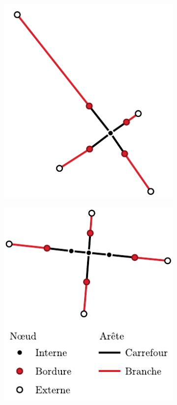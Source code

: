 \begin{figure}[ht]
    \centering
    \begin{subfigure}[t]{.25\linewidth}
        \centering
        \includegraphics[width=\linewidth]{images/evaluation/crseg/carrefour_simple.pdf}
        \caption{}
    \end{subfigure}
    \begin{subfigure}[t]{.25\linewidth}
        \centering
        \includegraphics[width=\linewidth]{images/evaluation/crseg/carrefour_intermediaire.pdf}

\end{subfigure}
\end{figure}
